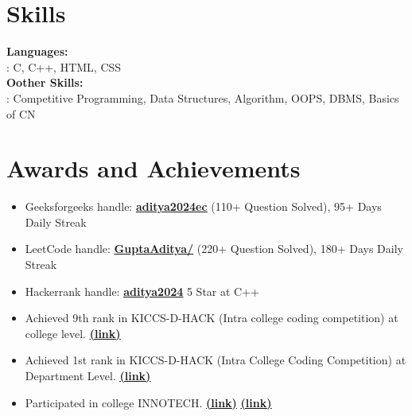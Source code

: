 \documentclass[a4paper,8pt]{article}
\begin{document}
\section{Skills}
\color[HTML]{1C033C}\textbf{Languages:} \\[2pt]
\color[HTML]{371e77} \hspace*{4ex} : C, C++, HTML, CSS\\[3pt]
\color[HTML]{1C033C}\textbf{Oother Skills:} \\[2pt]
\color[HTML]{371e77} \hspace*{4ex} : Competitive Programming, Data Structures, Algorithm, OOPS, DBMS, Basics of CN\\[3pt]

\section{Awards and Achievements}
\begin{minipage}[t]{\linewidth}
    \begin{itemize}[nosep,after=\strut, leftmargin=2em, itemsep=2pt]
        \item Geeksforgeeks handle:\color[HTML]{1C033C} \textbf{\uline{\href{https://auth.geeksforgeeks.org/user/aditya2024ec1188/practice}{ aditya2024ec}}} (110+ Question Solved), 95+ Days Daily Streak
        \item LeetCode handle: \color[HTML]{1C033C} \textbf{\uline{\href{https://leetcode.com/GuptaAditya/}{  GuptaAditya/}}} (220+ Question Solved), 180+ Days Daily Streak
          \item Hackerrank handle: \color[HTML]{1C033C} \textbf{\uline{\href{https://www.hackerrank.com/profile/aditya_2024ec111}{aditya2024}}} 5 Star at C++
            \item Achieved 9th rank in KICCS-D-HACK (Intra college coding competition) at college level. \color[HTML]{1C033C} \textbf{\uline{\href{https://drive.google.com/drive/folders/15AbsP8XsAV-0P0dnc_scWvhQ8lN_f9Te}{(link)}}}
         \item Achieved 1st rank in KICCS-D-HACK (Intra College Coding Competition) at Department Level.\color[HTML]{1C033C} \textbf{\uline{\href{https://drive.google.com/file/d/1sx484v3mJco3uMW3SRO0vheVhteHdej2/view}{(link)}}}
          \item Participated in college INNOTECH.\color[HTML]{1C033C} \textbf{\uline{\href{https://drive.google.com/file/d/1ZzpOOnrAgG7Rz4Oe_1szO-2hdGB0emJZ/view}{(link)}}}\color[HTML]{1C033C} \textbf{\uline{\href{https://drive.google.com/file/d/1x053AQw_YBLsiAtNdGqWPba4uYvAWS6U/view}{(link)}}}
    \end{itemize}
    \end{minipage}
\end{document}
